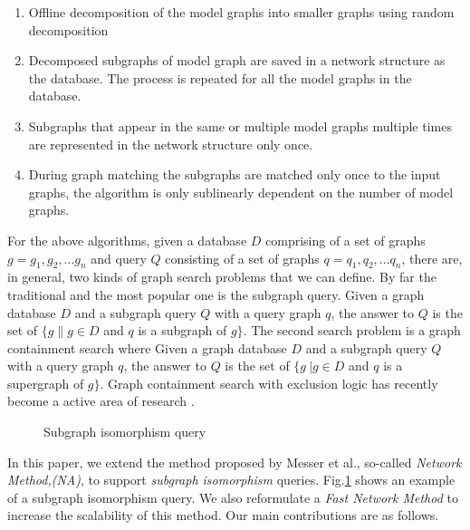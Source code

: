 \begin{enumerate}
\item Offline decomposition of the model graphs into smaller graphs using  random decomposition
\item Decomposed subgraphs of model graph are saved in a network structure as the database. The process is repeated for all the model graphs in the database.
\item Subgraphs that appear in the same or multiple model graphs multiple times are represented in the network structure only once.
\item During graph matching the subgraphs are matched only once to the input graphs, the algorithm is only sublinearly dependent on the number of model graphs.
\end{enumerate}

For the above algorithms, given a database $D$ comprising of a set of graphs $g=g_1 ,g_2 ,\ldots g_n$ and query $Q$ consisting of a set of graphs 
$q=q_1 ,q_2 ,\ldots q_n$, there are, in general, two kinds of graph search problems that we can define. By far the traditional and the most popular 
one is the subgraph query. Given a graph database $D$ and a subgraph query $Q$ with  a query graph $q$, the answer to $Q$ is the set of $\{g \| g\in D$ 
and $q$ is a subgraph of $g\} $. The second search problem is a graph containment search where Given a graph database $D$ and a subgraph query $Q$ with  
a query graph $q$, the answer to $Q$ is the set of $\{g\ | g\in D$ and $q$ is a supergraph of $g\}$. Graph containment search with exclusion logic has 
recently become a  active area of research \cite{chen2007_cindex} \cite{zhang_gao_wu2011}.  
 

\begin{figure}
\centering

\caption{Subgraph isomorphism query}
\label{fig:fig11}
\end{figure}


In this paper, we extend the method proposed by Messer et al.\cite{messmer_bunke2000}, so-called \textit{Network Method,(NA)}, to support \textit{subgraph isomorphism} queries.
Fig.\ref{fig:fig11} shows an example of a subgraph isomorphism query. We also reformulate a  \textit{Fast Network Method } to increase the scalability of this method.
Our main contributions are as follows.

